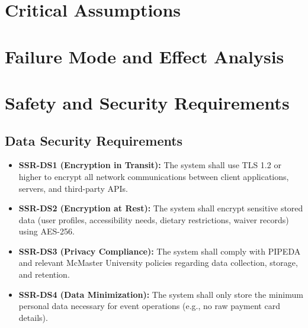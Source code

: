 \documentclass{article}
\begin{document}
\section{Critical Assumptions}


\section{Failure Mode and Effect Analysis}


\section{Safety and Security Requirements}

\subsection{Data Security Requirements}
\begin{itemize}
    \item \textbf{SSR-DS1 (Encryption in Transit):} The system shall use TLS 1.2 or higher to encrypt all network communications between client applications, servers, and third-party APIs.
    \item \textbf{SSR-DS2 (Encryption at Rest):} The system shall encrypt sensitive stored data (user profiles, accessibility needs, dietary restrictions, waiver records) using AES-256.
    \item \textbf{SSR-DS3 (Privacy Compliance):} The system shall comply with PIPEDA and relevant McMaster University policies regarding data collection, storage, and retention.
    \item \textbf{SSR-DS4 (Data Minimization):} The system shall only store the minimum personal data necessary for event operations (e.g., no raw payment card details).
\end{itemize}
\end{document}
